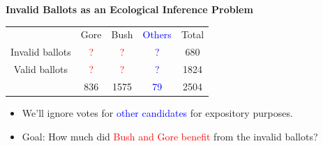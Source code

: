 \documentclass[landscape,letterpaper]{seminar}
\begin{document}

\begin{slide}
  \begin{center}
    \textbf{Invalid Ballots as an Ecological Inference Problem}
  \end{center}

\smallskip
\begin{center}
\small
\begin{table}
    \begin{tabular}{ccccc}
      & Gore  & Bush & \textcolor{Blue}{Others} & Total  \\
      \cline{2-4}
      Invalid ballots &   \textcolor{Red}{?}   &   \textcolor{Red}{?}  &   \textcolor{Blue}{?}    &  680   \\
      Valid ballots   &   \textcolor{Red}{?}   &   \textcolor{Red}{?}  &   \textcolor{Blue}{?}    & 1824   \\
      \cline{2-4}
      & 836   & 1575 &   \textcolor{Blue}{79}   & 2504   \\
    \end{tabular} 
\end{table} 
\end{center}

\begin{itemize}
\item We'll ignore votes for \textcolor{Blue}{other candidates} for expository purposes.
\item Goal: How much did \textcolor{Red}{Bush and Gore benefit} from the invalid ballots?
\end{itemize}

\end{slide}

\end{document}
